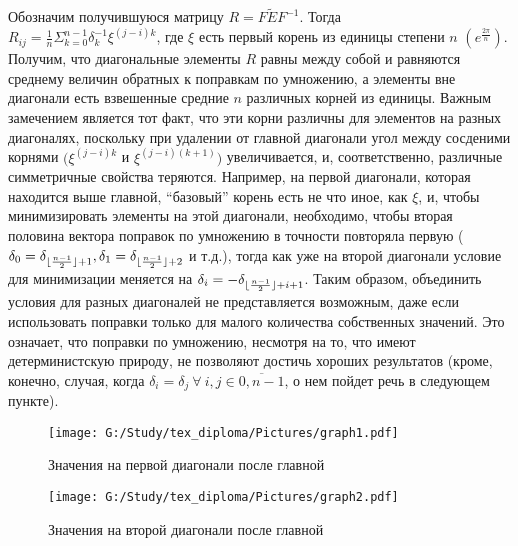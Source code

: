 \documentclass[a4paper]{article}
\DeclarePairedDelimiter\floor{\lfloor}{\rfloor}
\theoremstyle{definition}
\begin{document}
    Обозначим получившуюся матрицу $R = F\tilde{E}F^{-1}$. Тогда\\$R_{ij} = \frac{1}{n}\Sigma_{k=0}^{n-1} \delta_k^{-1} \xi^{(j-i)k}$, где $\xi$ есть первый корень из единицы степени $n$  $(e^{\frac{2\pi}{n}})$. Получим, что диагональные элементы $R$ равны между собой и равняются среднему величин обратных к поправкам по умножению, а элементы вне диагонали есть взвешенные средние $n$ различных корней из единицы. Важным замечением является тот факт, что эти корни различны для элементов на разных диагоналях, поскольку при удалении от главной диагонали угол между сосденими корнями $(\xi^{(j-i)k}$ и $\xi^{(j-i)(k+1)})$ увеличивается, и, соответственно, различные симметричные свойства теряются. Например, на первой диагонали, которая находится выше главной, ``базовый'' корень есть не что иное, как $\xi$, и, чтобы минимизировать элементы на этой диагонали, необходимо, чтобы вторая половина вектора поправок по умножению в точности повторяла первую ($\delta_0 = \delta_{\floor{\frac{n-1}{2}}+1}, \delta_1 = \delta_{\floor{\frac{n-1}{2}}+2}$ и т.д.), тогда как уже на второй диагонали условие для минимизации меняется на $\delta_i = -\delta_{\floor{\frac{n-1}{2}}+i+1}$. Таким образом, объединить условия для разных диагоналей не представляется возможным, даже если использовать поправки только для малого количества собственных значений. Это означает, что поправки по умножению, несмотря на то, что имеют детерминистскую природу, не позволяют достичь хороших результатов (кроме, конечно, случая, когда $\delta_i = \delta_j~ \forall~ i, j\in \overline{0, n-1}$, о нем пойдет речь в следующем пункте).


\hspace*{-\parindent}
\begin{minipage}{80mm}
    \begin{figure}[H]
            \texttt{[image: G:/Study/tex\_diploma/Pictures/graph1.pdf]}
            \label{Graph1}
            \caption[Значения на первой диагонали после главной]{Значения на первой диагонали после главной}
        \end{figure}
\end{minipage}
\begin{minipage}{80mm}
  \begin{figure}[H]
            \texttt{[image: G:/Study/tex\_diploma/Pictures/graph2.pdf]}
            \label{Graph2}
            \caption[Значения на второй диагонали после главной]{Значения на второй диагонали после главной}
        \end{figure}
\end{minipage}
\hfill
\vspace*{2mm}
\end{document}
